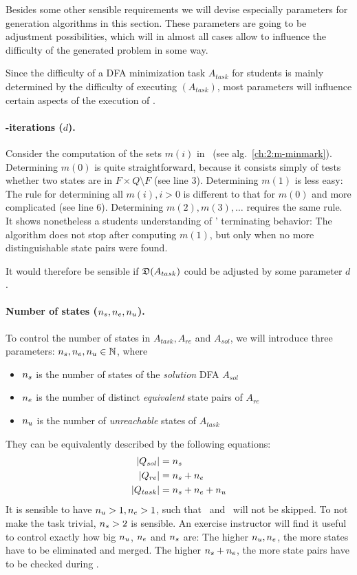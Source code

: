 
Besides some other sensible requirements we will devise especially parameters for generation algorithms in this section. These parameters are going to be adjustment possibilities, which will in almost all cases allow to influence the difficulty of the generated problem in some way.

Since the difficulty of a DFA minimization task $A_{task}$ for students is mainly determined by the difficulty of executing \MinAlg$(A_{task})$, most parameters will influence certain aspects of the execution of \MinAlg.

\paragraph*{\CompDist-iterations ($d$).}

Consider the computation of the sets $m(i)$ in \mCompDist\ (see alg.~\ref{ch:2:m-minmark}). Determining $m(0)$ is quite straightforward, because it consists simply of tests whether two states are in $F \times Q \setminus F$ (see line 3). Determining $m(1)$ is less easy: The rule for determining all $m(i), i > 0$ is different to that for $m(0)$ and more complicated (see line 6). Determining $m(2), m(3), \ldots$ requires the same rule. It shows nonetheless a students understanding of \CompDist' terminating behavior: The algorithm does not stop after computing $m(1)$, but only when no more distinguishable state pairs were found.

It would therefore be sensible if $\mathfrak{D}(A_{task})$ could be adjusted by some parameter $d$.

\paragraph*{Number of states \texorpdfstring{(${n_s}, {n_e}, {n_u}$)}{}.}

To control the number of states in $A_{task}, A_{re}$ and $A_{sol}$, we will introduce three parameters: ${n_s}, {n_e}, {n_u} \in \mathbb{N}$, where
\begin{itemize}
	\item ${n_s}$ is the number of states of the \emph{solution} DFA $A_{sol}$
	\item ${n_e}$ is the number of distinct \emph{equivalent} state pairs of $A_{re}$
	\item ${n_u}$ is the number of \emph{unreachable} states of $A_{task}$
\end{itemize}
They can be equivalently described by the following equations:
\begin{align*}
    |Q_{sol}| &= {n_s} \\
    |Q_{re}| &= {n_s} + {n_e} \\
    |Q_{task}| &= {n_s} + {n_e} + {n_u}
\end{align*}
It is sensible to have ${n_u} > 1, {n_e} > 1$, such that \RemUnr\ and \RemEq\ will not be skipped. To not make the task trivial, ${n_s} > 2$ is sensible. An exercise instructor will find it useful to control exactly how big ${n_u}$, ${n_e}$ and ${n_s}$ are: The higher ${n_u}, {n_e}$, the more states have to be eliminated and merged. The higher ${n_s} + {n_e}$, the more state pairs have to be checked during \CompDist.

